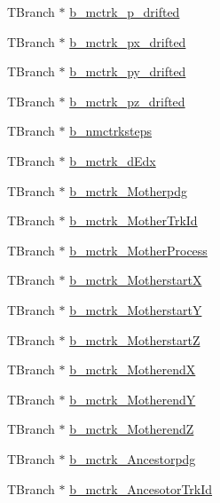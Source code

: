 \begin{DoxyCompactItemize}
\item 
T\-Branch $\ast$ \hyperlink{classanatree_ae5c1ae98ba04468999a94eb298a9a1ee}{b\-\_\-mctrk\-\_\-p\-\_\-drifted}
\item 
T\-Branch $\ast$ \hyperlink{classanatree_ab1597bfc7c8389540e59bafdaf6f26bc}{b\-\_\-mctrk\-\_\-px\-\_\-drifted}
\item 
T\-Branch $\ast$ \hyperlink{classanatree_a7aa4289ad7f470d430c481a716d3c2d5}{b\-\_\-mctrk\-\_\-py\-\_\-drifted}
\item 
T\-Branch $\ast$ \hyperlink{classanatree_ad7873c06a1a3dd57bba52173d47842d2}{b\-\_\-mctrk\-\_\-pz\-\_\-drifted}
\item 
T\-Branch $\ast$ \hyperlink{classanatree_ad8f989bb433d5ae95280293af6c95a6e}{b\-\_\-nmctrksteps}
\item 
T\-Branch $\ast$ \hyperlink{classanatree_a294073dd1048a78609b48052fe6e12d7}{b\-\_\-mctrk\-\_\-d\-Edx}
\item 
T\-Branch $\ast$ \hyperlink{classanatree_ac7df5b9ebb276a32a740260201c1e832}{b\-\_\-mctrk\-\_\-\-Motherpdg}
\item 
T\-Branch $\ast$ \hyperlink{classanatree_a358b146660efe52d40d506c53befc129}{b\-\_\-mctrk\-\_\-\-Mother\-Trk\-Id}
\item 
T\-Branch $\ast$ \hyperlink{classanatree_ac732d7a306c0844a6c130642cd7c2bb7}{b\-\_\-mctrk\-\_\-\-Mother\-Process}
\item 
T\-Branch $\ast$ \hyperlink{classanatree_a3974cadd7897b8fcc85a7af0d10a6195}{b\-\_\-mctrk\-\_\-\-Motherstart\-X}
\item 
T\-Branch $\ast$ \hyperlink{classanatree_a6e419ac1d91409f896959414b84713c5}{b\-\_\-mctrk\-\_\-\-Motherstart\-Y}
\item 
T\-Branch $\ast$ \hyperlink{classanatree_a118e731906061370dbcadee3789738b9}{b\-\_\-mctrk\-\_\-\-Motherstart\-Z}
\item 
T\-Branch $\ast$ \hyperlink{classanatree_abe5d7fc761462f24bc19c385c82ab0f7}{b\-\_\-mctrk\-\_\-\-Motherend\-X}
\item 
T\-Branch $\ast$ \hyperlink{classanatree_aca7ae13ef5e0c2905a3290829e17fa34}{b\-\_\-mctrk\-\_\-\-Motherend\-Y}
\item 
T\-Branch $\ast$ \hyperlink{classanatree_a19dbdc8b413c136c7341c2703da6ab35}{b\-\_\-mctrk\-\_\-\-Motherend\-Z}
\item 
T\-Branch $\ast$ \hyperlink{classanatree_a89c9b2b21369021a11f15b7302b74963}{b\-\_\-mctrk\-\_\-\-Ancestorpdg}
\item 
T\-Branch $\ast$ \hyperlink{classanatree_abb69fb4d422d41345116321e7dc65563}{b\-\_\-mctrk\-\_\-\-Ancesotor\-Trk\-Id}

\end{DoxyCompactItemize}
